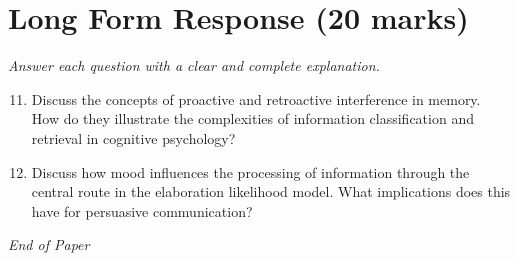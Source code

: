 \documentclass[12pt]{article}
\begin{document}
\section*{Long Form Response (20 marks)}
\textit{Answer each question with a clear and complete explanation.}
\begin{enumerate}[label=\arabic*.]
\setcounter{enumi}{10}
\item Discuss the concepts of proactive and retroactive interference in memory. How do they illustrate the complexities of information classification and retrieval in cognitive psychology?
\item Discuss how mood influences the processing of information through the central route in the elaboration likelihood model. What implications does this have for persuasive communication?
\end{enumerate}

\vfill
\noindent\textit{End of Paper}
\end{document}
